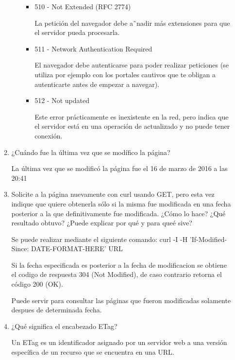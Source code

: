 \documentclass[a4paper,10pt]{article}
\begin{document}
\begin{enumerate}
\begin{enumerate}
\begin{itemize}
\begin{itemize}
                            \item 510 - Not Extended (RFC 2774)

                            La petición del navegador debe a˜nadir más extensiones para que el servidor pueda procesarla.

                            \item 511 - Network Authentication Required

                            El navegador debe autenticarse para poder realizar peticiones (se utiliza por ejemplo con los portales cautivos que te obligan a autenticarte antes de empezar a navegar).

                            \item 512 - Not updated

                            Este error prácticamente es inexistente en la red, pero indica que el servidor está en una operación de actualizado y no puede tener conexión.
                        \end{itemize}
                \end{itemize}

            \item ¿Cuándo fue la última vez que se modífico la página?

            La última vez que se modificó la página fue el 16 de marzo de 2016 a las 20:41

            \item Solicite a la página nuevamente con curl usando GET, pero esta vez indique que quiere obtenerla sólo si la misma fue modificada en una fecha posterior a la que definitivamente fue modificada. ¿Cómo lo hace? ¿Qué resultado obtuvo? ¿Puede explicar por qué y para queé sive?

            Se puede realizar mediante el siguiente comando: curl -I -H 'If-Modified-Since: DATE-FORMAT-HERE' URL

            Si la fecha especificada es posterior a la fecha de modificacion se obtiene el codigo de respuesta 304 (Not Modified), de caso contrario retorna el código 200 (OK).

            Puede servir para consultar las páginas que fueron modificadas solamente despues de determinada fecha.

            \item ¿Qué significa el encabezado ETag?

            Un ETag es un identificador asignado por un servidor web a una versión específica de un recurso que se encuentra en una URL.


\end{enumerate}
\end{enumerate}
\end{document}
